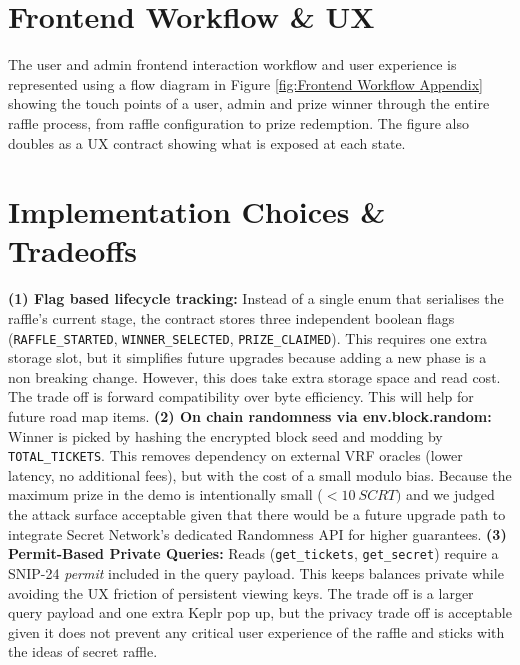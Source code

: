 \documentclass{article}
\begin{document}
\section{Frontend Workflow \& UX}
The user and admin frontend interaction workflow and user experience is represented using a flow diagram in Figure \ref{fig:Frontend Workflow Appendix} showing the touch points of a user, admin and prize winner through the entire raffle process, from raffle configuration to prize redemption. The figure also doubles as a UX contract showing what is exposed at each state.

\section{Implementation Choices \& Tradeoffs}

\textbf{(1) Flag based lifecycle tracking:} Instead of a single enum that serialises the raffle's current stage, the contract stores three independent boolean flags (\texttt{RAFFLE\_STARTED}, \texttt{WINNER\_SELECTED}, \texttt{PRIZE\_CLAIMED}). This requires one extra storage slot, but it simplifies future upgrades because adding a new phase is a non breaking change. However, this does take extra storage space and read cost. The trade off is forward compatibility over byte efficiency. This will help for future road map items. \textbf{(2) On chain randomness via env.block.random:} Winner is picked by hashing the encrypted block seed and modding by \texttt{TOTAL\_TICKETS}. This removes dependency on external VRF oracles (lower latency, no additional fees), but with the cost of a small modulo bias. Because the maximum prize in the demo is intentionally small (\(<10~SCRT)\) and we judged the attack surface acceptable given that there would be a future upgrade path to integrate Secret Network's dedicated Randomness API for higher guarantees. \textbf{(3) Permit-Based Private Queries:} Reads (\texttt{get\_tickets}, \texttt{get\_secret}) require a SNIP-24 \emph{permit} included in the query payload. This keeps balances private while avoiding the UX friction of persistent viewing keys. The trade off is a larger query payload and one extra Keplr pop up, but the privacy trade off is acceptable given it does not prevent any critical user experience of the raffle and sticks with the ideas of secret raffle.
\end{document}
